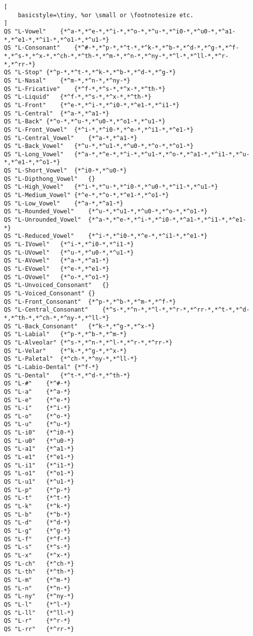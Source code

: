 \begin{lstlisting}[
    basicstyle=\tiny, %or \small or \footnotesize etc.
]
QS "L-Vowel"	{*^a-*,*^e-*,*^i-*,*^o-*,*^u-*,*^i0-*,*^u0-*,*^a1-*,*^e1-*,*^i1-*,*^o1-*,*^u1-*}
QS "L-Consonant"	{*^#-*,*^p-*,*^t-*,*^k-*,*^b-*,*^d-*,*^g-*,*^f-*,*^s-*,*^x-*,*^ch-*,*^th-*,*^m-*,*^n-*,*^ny-*,*^l-*,*^ll-*,*^r-*,*^rr-*}
QS "L-Stop"	{*^p-*,*^t-*,*^k-*,*^b-*,*^d-*,*^g-*}
QS "L-Nasal"	{*^m-*,*^n-*,*^ny-*}
QS "L-Fricative"	{*^f-*,*^s-*,*^x-*,*^th-*}
QS "L-Liquid"	{*^f-*,*^s-*,*^x-*,*^th-*}
QS "L-Front"	{*^e-*,*^i-*,*^i0-*,*^e1-*,*^i1-*}
QS "L-Central"	{*^a-*,*^a1-*}
QS "L-Back"	{*^o-*,*^u-*,*^u0-*,*^o1-*,*^u1-*}
QS "L-Front_Vowel"	{*^i-*,*^i0-*,*^e-*,*^i1-*,*^e1-*}
QS "L-Central_Vowel"	{*^a-*,*^a1-*}
QS "L-Back_Vowel"	{*^u-*,*^u1-*,*^u0-*,*^o-*,*^o1-*}
QS "L-Long_Vowel"	{*^a-*,*^e-*,*^i-*,*^u1-*,*^o-*,*^a1-*,*^i1-*,*^u-*,*^e1-*,*^o1-*}
QS "L-Short_Vowel"	{*^i0-*,*^u0-*}
QS "L-Dipthong_Vowel"	{}
QS "L-High_Vowel"	{*^i-*,*^u-*,*^i0-*,*^u0-*,*^i1-*,*^u1-*}
QS "L-Medium_Vowel"	{*^e-*,*^o-*,*^e1-*,*^o1-*}
QS "L-Low_Vowel"	{*^a-*,*^a1-*}
QS "L-Rounded_Vowel"	{*^u-*,*^u1-*,*^u0-*,*^o-*,*^o1-*}
QS "L-Unrounded_Vowel"	{*^a-*,*^e-*,*^i-*,*^i0-*,*^a1-*,*^i1-*,*^e1-*}
QS "L-Reduced_Vowel"	{*^i-*,*^i0-*,*^e-*,*^i1-*,*^e1-*}
QS "L-IVowel"	{*^i-*,*^i0-*,*^i1-*}
QS "L-UVowel"	{*^u-*,*^u0-*,*^u1-*}
QS "L-AVowel"	{*^a-*,*^a1-*}
QS "L-EVowel"	{*^e-*,*^e1-*}
QS "L-OVowel"	{*^o-*,*^o1-*}
QS "L-Unvoiced_Consonant"	{}
QS "L-Voiced_Consonant"	{}
QS "L-Front_Consonant"	{*^p-*,*^b-*,*^m-*,*^f-*}
QS "L-Central_Consonant"	{*^s-*,*^n-*,*^l-*,*^r-*,*^rr-*,*^t-*,*^d-*,*^th-*,*^ch-*,*^ny-*,*^ll-*}
QS "L-Back_Consonant"	{*^k-*,*^g-*,*^x-*}
QS "L-Labial"	{*^p-*,*^b-*,*^m-*}
QS "L-Alveolar"	{*^s-*,*^n-*,*^l-*,*^r-*,*^rr-*}
QS "L-Velar"	{*^k-*,*^g-*,*^x-*}
QS "L-Paletal"	{*^ch-*,*^ny-*,*^ll-*}
QS "L-Labio-Dental"	{*^f-*}
QS "L-Dental"	{*^t-*,*^d-*,*^th-*}
QS "L-#"	{*^#-*}
QS "L-a"	{*^a-*}
QS "L-e"	{*^e-*}
QS "L-i"	{*^i-*}
QS "L-o"	{*^o-*}
QS "L-u"	{*^u-*}
QS "L-i0"	{*^i0-*}
QS "L-u0"	{*^u0-*}
QS "L-a1"	{*^a1-*}
QS "L-e1"	{*^e1-*}
QS "L-i1"	{*^i1-*}
QS "L-o1"	{*^o1-*}
QS "L-u1"	{*^u1-*}
QS "L-p"	{*^p-*}
QS "L-t"	{*^t-*}
QS "L-k"	{*^k-*}
QS "L-b"	{*^b-*}
QS "L-d"	{*^d-*}
QS "L-g"	{*^g-*}
QS "L-f"	{*^f-*}
QS "L-s"	{*^s-*}
QS "L-x"	{*^x-*}
QS "L-ch"	{*^ch-*}
QS "L-th"	{*^th-*}
QS "L-m"	{*^m-*}
QS "L-n"	{*^n-*}
QS "L-ny"	{*^ny-*}
QS "L-l"	{*^l-*}
QS "L-ll"	{*^ll-*}
QS "L-r"	{*^r-*}
QS "L-rr"	{*^rr-*}


\end{lstlisting}
